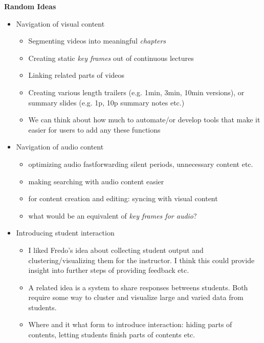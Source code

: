 \documentclass{report}
\begin{document}
\textbf{Random Ideas}
\begin{itemize}
\item Navigation of visual content
\begin{itemize}
\item Segmenting videos into meaningful \textit{chapters}
\item Creating static \textit{key frames} out of continuous lectures
\item Linking related parts of videos
\item Creating various length trailers (e.g. 1min, 3min, 10min versions), or summary slides (e.g. 1p, 10p summary notes etc.)
\item We can think about how much to automate/or develop tools that make it easier for users to add any these functions
\end{itemize}
\item Navigation of audio content
\begin{itemize}
\item optimizing audio fastforwarding silent periods, unnecessary content etc. 
\item making searching with audio content easier
\item for content creation and editing: syncing with visual content
\item what would be an equivalent of \textit{key frames for audio}?
\end{itemize}
\item Introducing student interaction
\begin{itemize}
\item I liked Fredo's idea about collecting student output and clustering/visualizing them for the instructor. I think this could provide insight into further steps of providing feedback etc.
\item A related idea is a system to share responses betweens students. Both require some way to cluster and visualize large and varied data from students. 
\item Where and it what form to introduce interaction: hiding parts of contents, letting students finish parts of contents etc.
\end{itemize}
\end{itemize}


\nocite{*}

\end{document}
